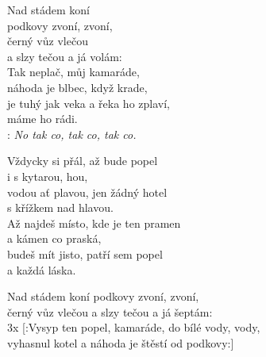 
Nad stádem koní\\
podkovy zvoní, zvoní,\\
černý vůz vlečou\\
a slzy tečou a já volám:\\
   
Tak neplač, můj kamaráde,\\
náhoda je blbec, když krade,\\
je tuhý jak veka a řeka ho zplaví,\\
máme ho rádi.\\

\textregistered:
\emph{
No tak co, tak co, tak co.\\
}

Vždycky si přál, až bude popel\\
i s kytarou, hou,\\
vodou ať plavou, jen žádný hotel\\
s křížkem nad hlavou.\\

Až najdeš místo, kde je ten pramen\\
a kámen co praská,\\
budeš mít jisto, patří sem popel\\
a každá láska.\\

\textregistered

Nad stádem koní podkovy zvoní, zvoní,\\
černý vůz vlečou a slzy tečou a já šeptám:\\
3x [:Vysyp ten popel, kamaráde, do bílé vody, vody,\\
vyhasnul kotel a náhoda je štěstí od podkovy:]
\newpage